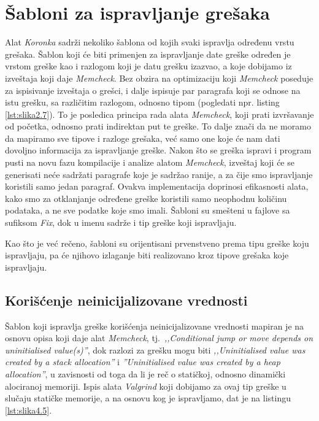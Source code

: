 \documentclass[12pt,oneside]{memoir}
\theoremstyle{plain}
\theoremstyle{definition}
\begin{document}
\section{Šabloni za ispravljanje grešaka}
Alat \textit{Koronka} sadrži nekoliko šablona od kojih svaki ispravlja određenu vrstu grešaka. Šablon koji će biti primenjen za ispravljanje date greške određen je vrstom greške kao i razlogom koji je datu grešku izazvao, a koje dobijamo iz izveštaja koji daje \textit{Memcheck}. Bez obzira na optimizaciju koji \textit{Memcheck} poseduje za ispisivanje izveštaja o grešci, i dalje ispisuje par paragrafa koji se odnose na istu grešku, sa različitim razlogom, odnosno tipom (pogledati npr. listing \ref{lst:slika2.7}). To je posledica principa rada alata \textit{Memcheck}, koji prati izvršavanje od početka, odnosno prati indirektan put te greške. To dalje znači da ne moramo da mapiramo sve tipove i razloge grešaka, već samo one koje će nam dati dovoljno informacija za ispravljanje greške. Nakon što se greška ispravi i program pusti na novu fazu kompilacije i analize alatom \textit{Memcheck}, izveštaj koji će se generisati neće sadržati paragrafe koje je sadržao ranije, a za čije smo ispravljanje koristili samo jedan paragraf. Ovakva implementacija doprinosi efikasnosti alata, kako smo za otklanjanje određene greške koristili samo neophodnu količinu podataka, a ne sve podatke koje smo imali. Šabloni su smešteni u fajlove sa sufiksom \textit{Fix}, dok u imenu sadrže i tip greške koji ispravljaju. 

Kao što je već rečeno, šabloni su orijentisani prvenstveno prema tipu greške koju ispravljaju, pa će njihovo izlaganje biti realizovano kroz tipove grešaka koje ispravljaju. 

\subsection{Korišćenje neinicijalizovane vrednosti}
Šablon koji ispravlja greške korišćenja neinicijalizovane vrednosti mapiran je na osnovu opisa koji daje alat \textit{Memcheck}, tj.~\textit{,,Conditional jump or move depends on uninitialised value(s)''}, dok razlozi za grešku mogu biti \textit{,,Uninitialised value was created by a stack allocation''} i \textit{''Uninitialised value was created by a heap allocation''}, u zavisnosti od toga da li je reč o statičkoj, odnosno dinamički alociranoj memoriji. Ispis alata \textit{Valgrind} koji dobijamo za ovaj tip greške u slučaju statičke memorije, a na osnovu kog je ispravljamo, dat je na listingu \ref{lst:slika4.5}.
\end{document}
